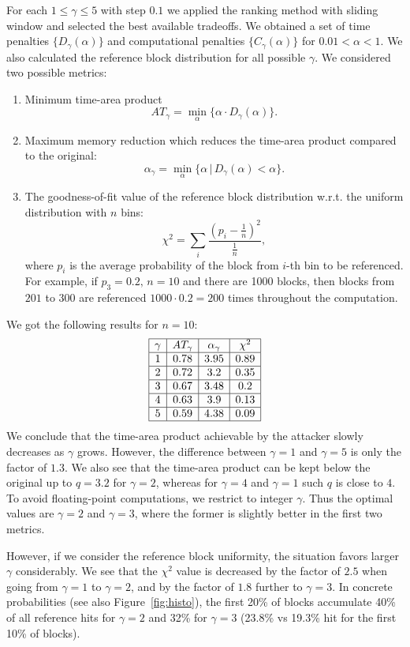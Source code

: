 \documentclass[a4paper]{article}
\begin{document}
For each $1\leq \gamma\leq 5$ with step $0.1$ we applied the ranking method with sliding window and selected the best available tradeoffs. We obtained a set of time penalties $\{D_{\gamma}(\alpha)\}$ and computational penalties $\{C_{\gamma}(\alpha)\}$ for $0.01<\alpha<1$. We also calculated the reference block distribution for all possible $\gamma$. We considered two possible metrics:
\begin{enumerate}
\item Minimum time-area product $$AT_{\gamma} = \min_{\alpha}\{\alpha\cdot D_{\gamma}(\alpha)\}.
$$
\item Maximum memory reduction which reduces the time-area product compared to the original:
$$
\alpha_{\gamma} = \min_{\alpha} \{\alpha\,|\,D_{\gamma}(\alpha)<\alpha\}.
$$
\item The goodness-of-fit value of the reference block distribution w.r.t. the uniform distribution with $n$ bins:
$$
\chi^2 = \sum_i \frac{(p_i-\frac{1}{n})^2}{\frac{1}{n}},
$$
where $p_i$ is the average probability of the block from $i$-th bin to be referenced. For example, if $p_3 = 0.2, \,n=10$ and there are 1000 blocks, then blocks from $201$ to $300$ are referenced $1000\cdot 0.2 =200$ times throughout the computation.  
\end{enumerate}
We got the following results for $n=10$:
$$
\begin{array}{|c|c|c|c|}
\hline
\gamma & AT_{\gamma}&\alpha_{\gamma} &\chi^2\\
\hline
 1&  0.78 & 3.95&0.89\\
  \hline 2 & 0.72 & 3.2& 0.35\\
 \hline 3 & 0.67 & 3.48&0.2\\
  \hline 4 & 0.63 & 3.9&0.13\\
 \hline 5 & 0.59 & 4.38&0.09\\
 \hline
\end{array}
$$
We conclude that the time-area product achievable by the attacker slowly decreases as $\gamma$ grows. However, the difference between $\gamma=1$ and $\gamma=5$ is only the factor of $1.3$. We also see that the time-area product can be kept below the original up to $q=3.2$ for $\gamma=2$, whereas for $\gamma=4$ and $\gamma=1$ such $q$ is close to $4$.
To avoid floating-point computations, we restrict to integer $\gamma$. Thus the optimal values are $\gamma=2$ and $\gamma=3$, where the former is slightly better in the first two metrics. 

However, if we consider the reference block uniformity, the situation favors larger $\gamma$ considerably. We see that the $\chi^2$ value is decreased by the factor of $2.5$ when going from $\gamma=1$ to $\gamma=2$, and by the factor of $1.8$ further to $\gamma=3$. In concrete probabilities (see also Figure~\ref{fig:histo}),
the first 20\% of blocks accumulate 40\% of all reference hits for $\gamma=2$ and 32\% for $\gamma=3$ (23.8\% vs  19.3\% hit for the first 10\% of blocks). 
\end{document}
